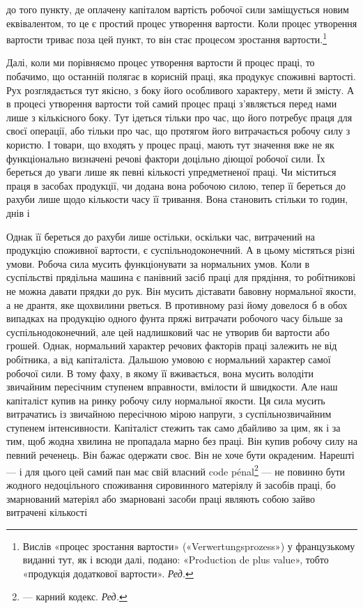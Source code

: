 \parcont{}  %
до того пункту, де оплачену капіталом вартість робочої сили заміщується
новим еквівалентом, то це є простий процес утворення
вартости. Коли процес утворення вартости триває поза цей пункт,
то він стає процесом зростання вартости.\footnote*{
Вислів «процес зростання вартости» («Verwertungsprozess») у французькому
виданні тут, як і всюди далі, подано: «Production de plus
value», тобто «продукція додаткової вартости». \emph{Ред.}
}

Далі, коли ми порівняємо процес утворення вартости й процес
праці, то побачимо, що останній полягає в корисній праці, яка
продукує споживні вартості. Рух розглядається тут якісно,
з боку його особливого характеру, мети й змісту. А в процесі
утворення вартости той самий процес праці з’являється перед
нами лише з кількісного боку. Тут ідеться тільки про час, що
його потребує праця для своєї операції, або тільки про час, що
протягом його витрачається робочу силу з користю. І товари,
що входять у процес праці, мають тут значення вже не як функціонально
визначені речові фактори доцільно діющої робочої
сили. Їх береться до уваги лише як певні кількості упредметненої
праці. Чи міститься праця в засобах продукції, чи додана
вона робочою силою, тепер її береться до рахуби лише щодо
кількости часу її тривання. Вона становить стільки то годин,
днів і~

Однак її береться до рахуби лише остільки, оскільки час,
витрачений на продукцію споживної вартости, є суспільнодоконечний.
А в цьому містяться різні умови. Робоча сила мусить
функціонувати за нормальних умов. Коли в суспільстві прядільна
машина є панівний засіб праці для прядіння, то робітникові
не можна давати прядки до рук. Він мусить діставати бавовну
нормальної якости, а не дрантя, яке щохвилини рветься. В противному
разі йому довелося б в обох випадках на продукцію одного
фунта пряжі витрачати робочого часу більше за суспільнодоконечний,
але цей надлишковий час не утворив би вартости
або грошей. Однак, нормальний характер речових факторів праці
залежить не від робітника, а від капіталіста. Дальшою умовою
є нормальний характер самої робочої сили. В тому фаху, в якому
її вживається, вона мусить володіти звичайним пересічним ступенем
вправности, вмілости й швидкости. Але наш капіталіст
купив на ринку робочу силу нормальної якости. Ця сила мусить
витрачатись із звичайною пересічною мірою напруги, з суспільнозвичайним
ступенем інтенсивности. Капіталіст стежить так само
дбайливо за цим, як і за тим, щоб жодна хвилина не пропадала
марно без праці. Він купив робочу силу на певний реченець.
Він бажає одержати своє. Він не хоче бути окраденим. Нарешті —
і для цього цей самий пан має свій власний code pénal\footnote*{
— карний кодекс. \emph{Ред.}
} — не
повинно бути жодного недоцільного споживання сировинного
матеріялу й засобів праці, бо змарнований матеріял або змарновані
засоби праці являють собою зайво витрачені кількості
\parbreak{}  %
